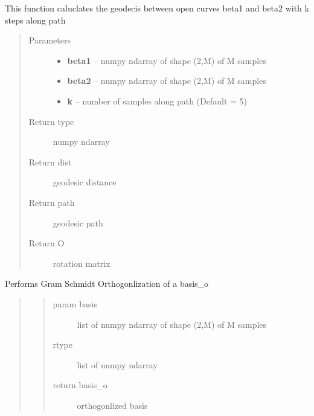 \documentclass[letterpaper,10pt,english]{sphinxmanual}
\begin{document}

\begin{fulllineitems}
\label{geodesic:geodesic.geod_sphere}
This function caluclates the geodecis between open curves beta1 and
beta2 with k steps along path
\begin{quote}\begin{description}
\item[{Parameters}] \leavevmode\begin{itemize}
\item {} 
\textbf{beta1} -- numpy ndarray of shape (2,M) of M samples

\item {} 
\textbf{beta2} -- numpy ndarray of shape (2,M) of M samples

\item {} 
\textbf{k} -- number of samples along path (Default = 5)

\end{itemize}

\item[{Return type}] \leavevmode
numpy ndarray

\item[{Return dist}] \leavevmode
geodesic distance

\item[{Return path}] \leavevmode
geodesic path

\item[{Return O}] \leavevmode
rotation matrix

\end{description}\end{quote}

\end{fulllineitems}


\begin{fulllineitems}
\label{geodesic:geodesic.gram_schmidt}
Performs Gram Schmidt Orthogonlization of a basis\_o
\begin{quote}
\begin{quote}\begin{description}
\item[{param basis}] \leavevmode
list of numpy ndarray of shape (2,M) of M samples

\item[{rtype}] \leavevmode
list of numpy ndarray

\item[{return basis\_o}] \leavevmode
orthogonlized basis

\end{description}\end{quote}
\end{quote}

\end{fulllineitems}
\end{document}
